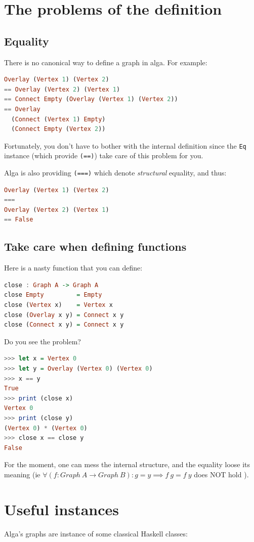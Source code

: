\documentclass[10pt,a4paper]{article}
\begin{document}
\section{The problems of the definition}
\subsection{Equality}
There is no canonical way to define a graph in alga. For example:
\begin{lstlisting}[language=Haskell, frame=single]
Overlay (Vertex 1) (Vertex 2)
== Overlay (Vertex 2) (Vertex 1)
== Connect Empty (Overlay (Vertex 1) (Vertex 2))
== Overlay
  (Connect (Vertex 1) Empty)
  (Connect Empty (Vertex 2))
\end{lstlisting}

Fortunately, you don't have to bother with the internal definition since the \verb|Eq| instance (which provide \verb|(==)|) take care of this problem for you.

Alga is also providing \verb|(===)| which denote \emph{structural} equality, and thus:

\begin{lstlisting}[language=Haskell, frame=single]
Overlay (Vertex 1) (Vertex 2)
===
Overlay (Vertex 2) (Vertex 1)
== False
\end{lstlisting}

\subsection{Take care when defining functions}
Here is a nasty function that you can define:
\begin{lstlisting}[language=Haskell, frame=single]
close : Graph A -> Graph A
close Empty         = Empty
close (Vertex x)    = Vertex x
close (Overlay x y) = Connect x y
close (Connect x y) = Connect x y
\end{lstlisting}

Do you see the problem?
\begin{lstlisting}[language=Haskell, frame=single]
>>> let x = Vertex 0
>>> let y = Overlay (Vertex 0) (Vertex 0)
>>> x == y
True
>>> print (close x)
Vertex 0
>>> print (close y)
(Vertex 0) * (Vertex 0)
>>> close x == close y
False
\end{lstlisting}
For the moment, one can mess the internal structure, and the equality loose its meaning (ie $\forall (f: Graph \ A \to Graph \ B) : g = y \implies f \ g = f \ y$ does NOT hold ).

\section{Useful instances}
Alga's graphs are instance of some classical Haskell classes:
\end{document}
